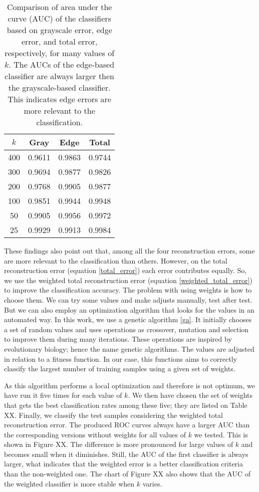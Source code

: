 \documentclass[10pt, conference, compsocconf]{IEEEtran}
\begin{document}
\begin{table}
  \caption{Comparison of area under the curve (AUC) of the classifiers based on grayscale error, edge error, and total error, respectively, for many values of $k$. The AUCs of the edge-based classifier are always larger then the grayscale-based classifier. This indicates edge errors are more relevant to the classification.}
  \begin{center}
    \begin{tabular}{  c | c  c  c  }
      \hline
      $k$ & Gray & Edge & Total \\
      \hline
      400 & 0.9611 & 0.9863 & 0.9744 \\
      300 & 0.9694 & 0.9877 & 0.9826 \\ 
      200 & 0.9768 & 0.9905 & 0.9877 \\
      100 & 0.9851 & 0.9944 & 0.9948 \\
      50  & 0.9905 & 0.9956 & 0.9972 \\
      25  & 0.9929 & 0.9913 & 0.9984 \\
      \hline  
    \end{tabular}
  \end{center}
  \label{table-gray-vs-edge}
\end{table}

These findings also point out that, among all the four reconstruction errors, some are more relevant to the classification than others. However, on the total reconstruction error (equation \ref{total_error}) each error contributes equally. So, we use the weighted total reconstruction error (equation \ref{weighted_total_error}) to improve the classification accuracy. The problem with using weights is how to choose them. We can try some values and make adjusts manually, test after test. But we can also employ an optimization algorithm that looks for the values in an automated way. In this work, we use a genetic algorithm \ref{ga}. It initially chooses a set of random values and uses operations as crossover, mutation and selection to improve them during many iterations. These operations are inspired by evolutionary biology; hence the name genetic algorithms. The values are adjusted in relation to a fitness function. In our case, this functions aims to correctly classify the largest number of training samples using a given set of weights.

As this algorithm performs a local optimization and therefore is not optimum, we have run it five times for each value of $k$. We then have chosen the set of weights that gets the best classification rates among these five; they are listed on Table XX. Finally, we classify the test samples considering the weighted total reconstruction error. The produced ROC curves always have a larger AUC than the corresponding versions without weights for all values of $k$ we tested. This is shown in Figure XX. The difference is more pronounced for large values of $k$ and becomes small when it diminishes. Still, the AUC of the first classifier is always larger, what indicates that the weighted error is a better classification criteria than the non-weighted one. The chart of Figure XX also shows that the AUC of the weighted classifier is more stable when $k$ varies.
\end{document}
